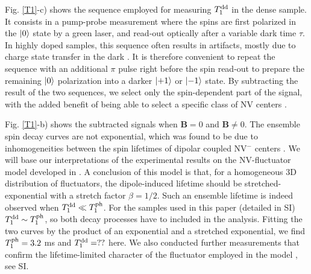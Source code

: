 \documentclass[preprintnumbers,amsmath,amssymb,superscriptaddress,twocolumn,showpacs]{revtex4-2}
\begin{document}
Fig. \ref{T1}-c) shows the sequence employed for measuring $T_1^{\rm dd}$ in the dense sample. 
It consists in a pump-probe measurement where the spins are first polarized in the $\ket{0}$ state by a green laser, and read-out optically after a variable dark time $\tau$. In highly doped samples, this sequence often results in artifacts, mostly due to charge state transfer in the dark \citep{giri_coupled_2018, giri_selective_2019}. It is therefore convenient to repeat the sequence with an additional $\pi$ pulse right before the spin read-out to prepare the remaining $\ket{0}$ polarization into a darker $\ket{+1}$ or $\ket{-1}$ state. By subtracting the result of the two sequences, we select only the spin-dependent part of the signal, with the added benefit of being able to select a specific class of NV centers \citep{jarmola_temperature-_2012, mrozek_longitudinal_2015, choi_depolarization_2017}. 

Fig. \ref{T1}-b) shows the subtracted signals when $\bm B=0$ and $\bm B \neq 0$.
The ensemble spin decay curves are not exponential, which was found to be due to inhomogeneities between the spin lifetimes of dipolar coupled NV$^-$ centers \citep{choi_depolarization_2017}.
We will base our interpretations of the experimental results on the NV-fluctuator model developed in \citep{choi_depolarization_2017}. A conclusion of this model is that, for a homogeneous 3D distribution of fluctuators, the dipole-induced lifetime should be stretched-exponential with a stretch factor $\beta=1/2$. Such an ensemble lifetime is indeed observed when $T_1^{\rm dd} \ll T_1^{\rm ph}$.
For the samples used in this paper (detailed in SI) $T_1^{\rm dd} \sim T_1^{\rm ph}$, so both decay processes have to included in the analysis. Fitting the two curves by the product of an exponential and a stretched exponential, we find $T_1^{\rm ph}=3.2$ ms and $T_1^{\rm dd}= ??$ here. We also conducted further measurements that confirm the lifetime-limited character of the fluctuator employed in the model \citep{choi_depolarization_2017}, see SI. 

\end{document}
